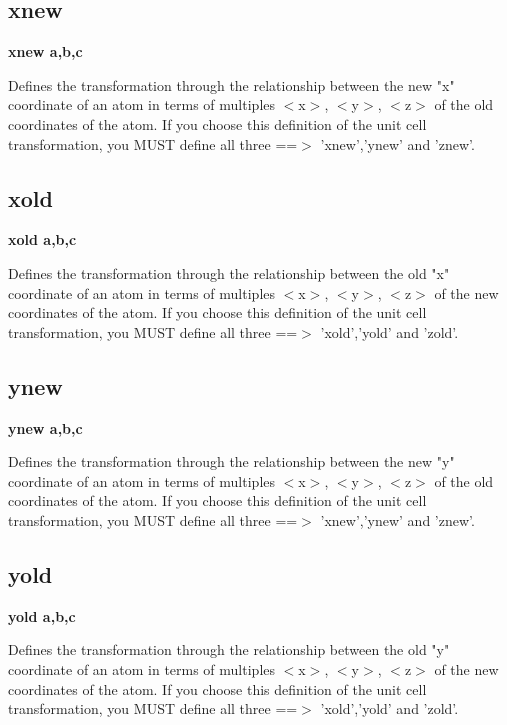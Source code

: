 \subsection*{xnew}
{\bf xnew a,b,c \par }
\par
\vspace{3pt}
Defines the transformation through the relationship between the new 
"x" coordinate of an atom in terms of multiples $ <$x$> $, $ <$y$> $, $ <$z$> $ of 
the old coordinates of the atom. 
If you choose this definition of the unit cell transformation, you MUST 
define all three ==$> $ 'xnew','ynew' and 'znew'. 
\subsection*{xold}
{\bf xold a,b,c \par }
\par
\vspace{3pt}
Defines the transformation through the relationship between the old 
"x" coordinate of an atom in terms of multiples $ <$x$> $, $ <$y$> $, $ <$z$> $ of 
the new coordinates of the atom. 
If you choose this definition of the unit cell transformation, you MUST 
define all three ==$> $ 'xold','yold' and 'zold'. 
\subsection*{ynew}
{\bf ynew a,b,c \par }
\par
\vspace{3pt}
Defines the transformation through the relationship between the new 
"y" coordinate of an atom in terms of multiples $ <$x$> $, $ <$y$> $, $ <$z$> $ of 
the old coordinates of the atom. 
If you choose this definition of the unit cell transformation, you MUST 
define all three ==$> $ 'xnew','ynew' and 'znew'. 
\subsection*{yold}
{\bf yold a,b,c \par }
\par
\vspace{3pt}
Defines the transformation through the relationship between the old 
"y" coordinate of an atom in terms of multiples $ <$x$> $, $ <$y$> $, $ <$z$> $ of 
the new coordinates of the atom. 
If you choose this definition of the unit cell transformation, you MUST 
define all three ==$> $ 'xold','yold' and 'zold'. 
